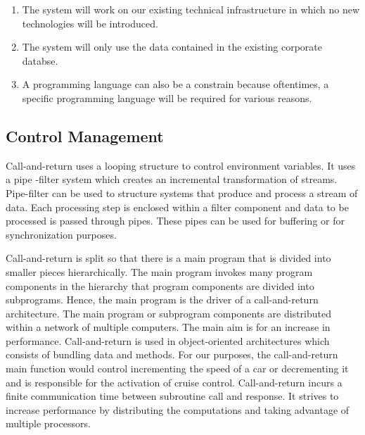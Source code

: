 \documentclass[preprint,11pt,3p]{article}
\begin{document}
\begin{enumerate} 
	\item The system will work on our existing technical infrastructure in which no new technologies will be introduced.
	\item The system will only use the data contained in the existing corporate databse.
	\item A programming language can also be a constrain because oftentimes, a specific programming language will be required for various reasons. 
\end{enumerate}

\subsection{Control Management} 
Call-and-return uses a looping structure to control environment variables. It uses a pipe -filter system which creates an incremental transformation of streams. Pipe-filter can be used to structure systems that produce and process a stream of data. Each processing step is enclosed within a filter component and data to be processed is passed through pipes. These pipes can be used for buffering or for synchronization purposes. \par
Call-and-return is split so that there is a main program that is divided into smaller pieces hierarchically. The main program invokes many program components in the hierarchy that program components are divided into subprograms. Hence, the main program is the driver of a call-and-return architecture. The main program or subprogram components are distributed within a network of multiple computers. The main aim is for an increase in performance. Call-and-return is used in object-oriented architectures which consists of bundling data and methods. For our purposes, the call-and-return main function would control incrementing the speed of a car or decrementing it and is responsible for the activation of cruise control. Call-and-return incurs a finite communication time between subroutine call and response. It strives to increase performance by distributing the computations and taking advantage of multiple processors. 
\end{document}
